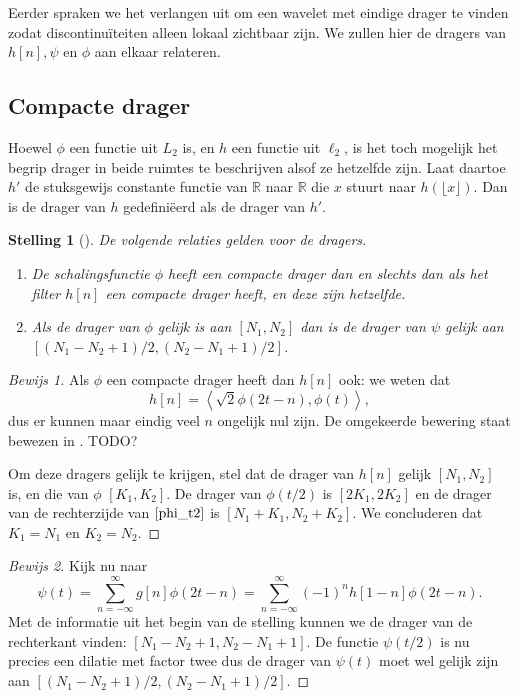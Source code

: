 \documentclass[11pt]{report}
\newcommand{\R}{\mathbb{R}}
\theoremstyle{plain}
\newtheorem*{stelling}{Stelling}
\theoremstyle{remark}
\begin{document}
Eerder spraken we het verlangen uit om een wavelet met eindige drager te vinden zodat discontinu\"iteiten alleen lokaal zichtbaar zijn. We zullen hier de dragers van $h[n], \psi$ en $\phi$ aan elkaar relateren.

\subsection{Compacte drager} 
Hoewel $\phi$ een functie uit $L_2$ is, en $h$ een functie uit $\ell_2$, is het toch mogelijk het begrip drager in beide ruimtes te beschrijven alsof ze hetzelfde zijn. Laat daartoe $h'$ de stuksgewijs constante functie van $\R$ naar $\R$ die $x$ stuurt naar $h(\lfloor x \rfloor)$. Dan is de drager van $h$ gedefini\"eerd als de drager van $h'$.

\begin{stelling}[{\cite[P7.2]{mallat}}]
  De volgende relaties gelden voor de dragers.
  \begin{enumerate}
    \item De schalingsfunctie $\phi$ heeft een compacte drager dan en slechts dan als het filter $h[n]$ een compacte drager heeft, en deze zijn hetzelfde.
    \item Als de drager van $\phi$ gelijk is aan $[N_1,N_2]$ dan is de drager van $\psi$ gelijk aan $[(N_1 - N_2 + 1)/2, (N_2 - N_1 + 1)/2]$.
  \end{enumerate}
\end{stelling}
\begin{proof}[Bewijs 1] Als $\phi$ een compacte drager heeft dan $h[n]$ ook: we weten dat
\[
  h[n] = \left\langle \sqrt{2} \phi\left(2t-n\right), \phi(t) \right\rangle,
\]
dus er kunnen maar eindig veel $n$ ongelijk nul zijn. De omgekeerde bewering staat bewezen in \cite{daubechies[P965-967]}. TODO?

Om deze dragers gelijk te krijgen, stel dat de drager van $h[n]$ gelijk $[N_1,N_2]$ is, en die van $\phi$ $[K_1, K_2]$. De drager van $\phi(t/2)$ is $[2K_1, 2K_2]$ en de drager van de rechterzijde van $\ref{phi_t2}$ is $[N_1 + K_1, N_2 + K_2]$. We concluderen dat $K_1 = N_1$ en $K_2 = N_2$.
\end{proof}
\begin{proof}[Bewijs 2]
Kijk nu naar
\[
\psi\left(t\right) = \sum_{n=-\infty}^{\infty} g[n] \phi(2t-n) = \sum_{n=-\infty}^{\infty} (-1)^{n}h[1-n] \phi(2t-n).
\]
Met de informatie uit het begin van de stelling kunnen we de drager van de rechterkant vinden: $[N_1 - N_2 + 1, N_2 - N_1 + 1]$. De functie $\psi(t/2)$ is nu precies een dilatie met factor twee dus de drager van $\psi(t)$ moet wel gelijk zijn aan $[(N_1 - N_2 + 1)/2, (N_2 - N_1 + 1)/2]$.
\end{proof}
\end{document}
